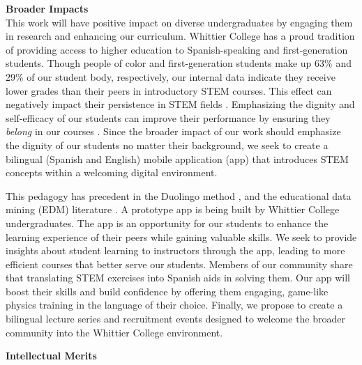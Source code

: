 \documentclass[11pt]{amsart}
\begin{document}
\noindent \textbf{Broader Impacts} \\ \noindent This work will have positive impact on diverse undergraduates by engaging them in research and enhancing our curriculum.  Whittier College has a proud tradition of providing access to higher education to Spanish-speaking and first-generation students.  Though people of color and first-generation students make up 63\% and 29\% of our student body, respectively, our internal data indicate they receive lower grades than their peers in introductory STEM courses.  This effect can negatively impact their persistence in STEM fields \cite{10.1080/00221546.2021.1907169}.  Emphasizing the dignity and self-efficacy of our students can improve their performance by ensuring they \textit{belong} in our courses \cite{cottrell1,cottrell2}.  Since the broader impact of our work should emphasize the dignity of our students no matter their background, we seek to create a bilingual (Spanish and English) mobile application (app) that introduces STEM concepts within a welcoming digital environment.

This pedagogy has precedent in the Duolingo method \cite{duolingo_whitepaper}, and the educational data mining (EDM) literature \cite{edm1,edm2,edm3,edm4}. A prototype app is being built by Whittier College undergraduates.  The app is an opportunity for our students to enhance the learning experience of their peers while gaining valuable skills.  We seek to provide insights about student learning to instructors through the app, leading to more efficient courses that better serve our students.  Members of our community share that translating STEM exercises into Spanish aids in solving them.  Our app will boost their skills and build confidence by offering them engaging, game-like physics training in the language of their choice.  Finally, we propose to create a bilingual lecture series and recruitment events designed to welcome the broader community into the Whittier College environment.

\clearpage

\centerline{\bf \Large Intellectual Merits}
\setcounter{section}{0}
\linespacing

\label{sec:top}
\end{document}
